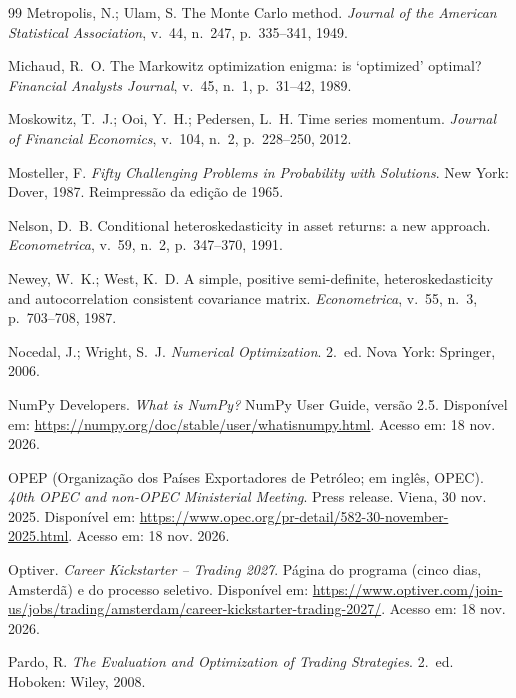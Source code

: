 \begin{thebibliography}{99}
Metropolis, N.; Ulam, S. The Monte Carlo method. \emph{Journal of the American Statistical Association}, v.~44, n.~247, p.~335--341, 1949.

Michaud, R.~O. The Markowitz optimization enigma: is `optimized' optimal? \emph{Financial Analysts Journal}, v.~45, n.~1, p.~31--42, 1989.

Moskowitz, T.~J.; Ooi, Y.~H.; Pedersen, L.~H. Time series momentum. \emph{Journal of Financial Economics}, v.~104, n.~2, p.~228--250, 2012.

Mosteller, F. \emph{Fifty Challenging Problems in Probability with Solutions}. New York: Dover, 1987. Reimpressão da edição de 1965.

Nelson, D.~B. Conditional heteroskedasticity in asset returns: a new approach. \emph{Econometrica}, v.~59, n.~2, p.~347--370, 1991.

Newey, W.~K.; West, K.~D. A simple, positive semi-definite, heteroskedasticity and autocorrelation consistent covariance matrix. \emph{Econometrica}, v.~55, n.~3, p.~703--708, 1987.

Nocedal, J.; Wright, S.~J. \emph{Numerical Optimization}. 2.~ed. Nova York: Springer, 2006.

NumPy Developers. \emph{What is NumPy?} NumPy User Guide, versão 2.5. Disponível em: \url{https://numpy.org/doc/stable/user/whatisnumpy.html}. Acesso em: 18 nov. 2026.

OPEP (Organização dos Países Exportadores de Petróleo; em inglês, OPEC). \emph{40th OPEC and non-OPEC Ministerial Meeting}. Press release. Viena, 30 nov. 2025. Disponível em: \url{https://www.opec.org/pr-detail/582-30-november-2025.html}. Acesso em: 18 nov. 2026.

Optiver. \emph{Career Kickstarter -- Trading 2027}. Página do programa (cinco dias, Amsterdã) e do processo seletivo. Disponível em: \url{https://www.optiver.com/join-us/jobs/trading/amsterdam/career-kickstarter-trading-2027/}. Acesso em: 18 nov. 2026.

Pardo, R. \emph{The Evaluation and Optimization of Trading Strategies}. 2.~ed. Hoboken: Wiley, 2008.


\end{thebibliography}
